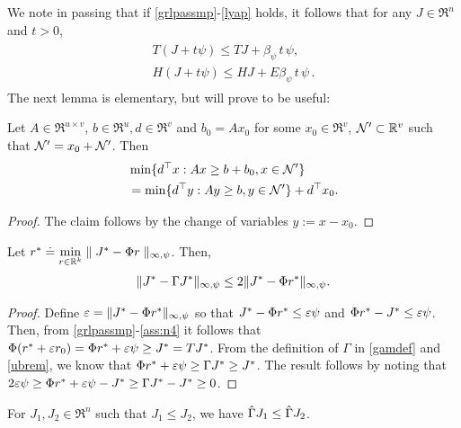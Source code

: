 We note in passing that if \cref{grlpassmp}-\eqref{lyap} holds, it follows that for any $J\in \Re^n$ and $t>0$,
\begin{align}\label{eq:psilin}
\begin{split}
T(J+ t \psi ) \le TJ + \beta_{\psi}\,t\,  \psi,\\
H(J+ t \psi ) \le HJ + E \beta_{\psi}\,t\,  \psi\,.
\end{split}
\end{align}
%
The next lemma is elementary, but will prove to be useful:
\begin{lemma}\label{lpsol}
Let $A\in \Re^{u\times v}$, $b\in \Re^u,d\in \Re^v$ and $b_0=Ax_0$ for
some $x_0 \in \Re^v$, $\mathcal{N}' \subset \mathbb{R}^v$ such that $\mathcal{N}' =x_0+ \mathcal{N}'$. Then
\begin{align}
&\min\{d^\top x:Ax\geq b+b_0, x\in \mathcal{N}'\} \nonumber\\
&=\min\{d^\top y:Ay \geq b, y \in \mathcal{N}' \}+d^\top x_0.
\end{align}
\end{lemma}
\begin{proof}
The claim follows by the change of variables $y := x-x_0$.
\end{proof}
\noindent 
\begin{lemma}\label{bestbndmn}
Let $r^*\doteq\underset{r\in \mathbb{R}^k}{\min}\parallel J^*-\Phi r\parallel_{\infty,\psi}$. Then,
\begin{align}
\|J^*-\Gamma J^*\|_{\infty,\psi}\leq 2 \|J^*-\Phi r^*\|_{\infty,\psi}.
\end{align}
\end{lemma}
\begin{proof}
Define $\varepsilon = \|J^* - \Phi r^*\|_{\infty,\psi}$ so that
$ J^*-\Phi r^* \le \varepsilon \psi$ and $\Phi r^* - J^*\le \varepsilon \psi$. Then, from \cref{grlpassmp}-\eqref{ass:n4} it follows that $\Phi( r^* + \varepsilon r_0 ) = \Phi r^* + \varepsilon \psi \ge J^* = T J^*$. From the definition of $\Gamma$ in \eqref{gamdef} and \cref{ubrem}, we know that $\Phi r^*+\varepsilon \psi \geq \Gamma J^*\geq J^*$. The result follows by noting that $2\varepsilon\psi\geq \Phi r^*+\varepsilon\psi -J^*\geq \Gamma J^*-J^*\geq 0$.
\end{proof}
\begin{lemma}\label{tgmonotone}
For $J_1, J_2\in \Re^n$ such that $J_1\leq J_2$, we have $\hat{\Gamma} J_1\leq \hat{\Gamma} J_2$.
\end{lemma}
